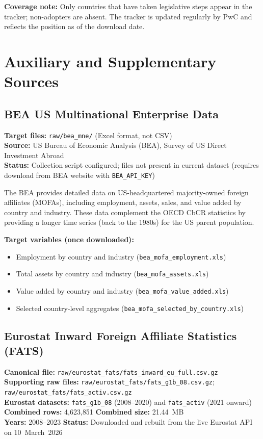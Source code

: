 \documentclass[11pt,a4paper]{article}
\begin{document}
\noindent\textbf{Coverage note:} Only countries that have taken legislative steps appear
in the tracker; non-adopters are absent.  The tracker is updated regularly by
PwC and reflects the position as of the download date.


\section{Auxiliary and Supplementary Sources}
\label{sec:auxiliary}

\subsection{BEA US Multinational Enterprise Data}
\label{subsec:bea}

\textbf{Target files:} \texttt{raw/bea\_mne/} (Excel format, not CSV)\\
\textbf{Source:} US Bureau of Economic Analysis (BEA), Survey of US Direct
Investment Abroad\\
\textbf{Status:} Collection script configured; files not present in current
dataset (requires download from BEA website with \texttt{BEA\_API\_KEY})

The BEA provides detailed data on US-headquartered majority-owned foreign
affiliates (MOFAs), including employment, assets, sales, and value added by
country and industry.  These data complement the OECD CbCR statistics by
providing a longer time series (back to the 1980s) for the US parent population.

\textbf{Target variables (once downloaded):}
\begin{itemize}[noitemsep]
    \item Employment by country and industry (\texttt{bea\_mofa\_employment.xls})
    \item Total assets by country and industry (\texttt{bea\_mofa\_assets.xls})
    \item Value added by country and industry (\texttt{bea\_mofa\_value\_added.xls})
    \item Selected country-level aggregates (\texttt{bea\_mofa\_selected\_by\_country.xls})
\end{itemize}

\subsection{Eurostat Inward Foreign Affiliate Statistics (FATS)}
\label{subsec:eurostat}

\textbf{Canonical file:} \texttt{raw/eurostat\_fats/fats\_inward\_eu\_full.csv.gz}\\
\textbf{Supporting raw files:} \texttt{raw/eurostat\_fats/fats\_g1b\_08.csv.gz};
\texttt{raw/eurostat\_fats/fats\_activ.csv.gz}\\
\textbf{Eurostat datasets:} \texttt{fats\_g1b\_08} (2008--2020) and
\texttt{fats\_activ} (2021 onward)\\
\textbf{Combined rows:} 4{,}623{,}851 \quad \textbf{Combined size:} 21.44~MB\\
\textbf{Years:} 2008--2023 \quad \textbf{Status:} Downloaded and rebuilt from the
live Eurostat API on 10~March~2026
\end{document}

